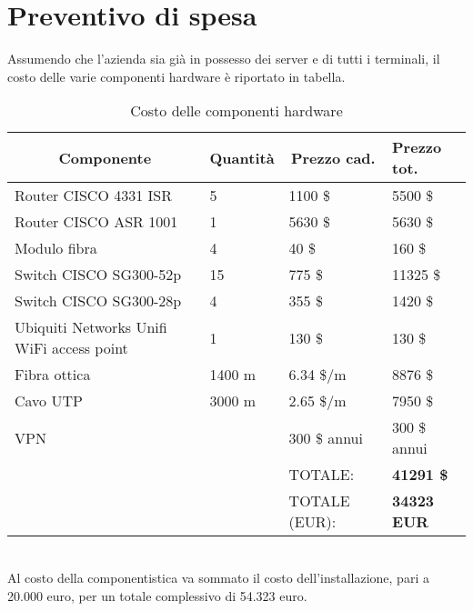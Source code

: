 \documentclass[a4paper,11pt]{article}
\begin{document}
\section{Preventivo di spesa}
Assumendo che l'azienda sia già in possesso dei server e di tutti i terminali, il costo delle varie componenti hardware è riportato in tabella.
\begin{table}[H]
\centering
\label{costo componentistica}
\begin{tabular}{ll|l|l|}
\hline
\multicolumn{1}{|c|}{\textbf{Componente}} & \multicolumn{1}{c|}{\textbf{Quantità}} & \multicolumn{1}{c|}{\textbf{Prezzo cad.}} & \textbf{Prezzo tot.} \\ \hline
\multicolumn{1}{|l|}{Router CISCO 4331 ISR} & 5 & 1100 \$ & 5500 \$ \\ \hline
\multicolumn{1}{|l|}{Router CISCO ASR 1001} & 1 & 5630 \$ & 5630 \$ \\ \hline
\multicolumn{1}{|l|}{Modulo fibra} & 4 & 40 \$ & 160 \$ \\ \hline
\multicolumn{1}{|l|}{Switch CISCO SG300-52p} & 15 & 775 \$ & 11325 \$ \\ \hline
\multicolumn{1}{|l|}{Switch CISCO SG300-28p} & 4 & 355 \$ & 1420 \$ \\ \hline
\multicolumn{1}{|l|}{Ubiquiti Networks Unifi WiFi access point} & 1 & 130 \$ & 130 \$ \\ \hline
\multicolumn{1}{|l|}{Fibra ottica} & 1400 m & 6.34 \$/m & 8876 \$ \\ \hline
\multicolumn{1}{|l|}{Cavo UTP} & 3000 m & 2.65 \$/m & 7950 \$ \\ \hline
\multicolumn{1}{|l|}{VPN} &  & 300 \$ annui & 300 \$ annui \\ \hline
 &  & TOTALE: & \textbf{41291 \$} \\ \cline{3-4} 
 &  & TOTALE (EUR): & \textbf{34323 EUR} \\ \cline{3-4} 
\end{tabular}
\caption{Costo delle componenti hardware}
\end{table}
\ \\Al costo della componentistica va sommato il costo dell'installazione, pari a 20.000 euro, per un totale complessivo di 54.323 euro.
\end{document}
